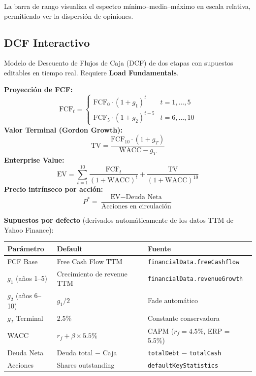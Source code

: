 \documentclass[11pt, a4paper]{article}
\newcommand{\code}[1]{\texttt{#1}}
\begin{document}
La barra de rango visualiza el espectro mínimo--media--máximo en escala relativa, permitiendo ver la dispersión de opiniones.

\subsection{DCF Interactivo}

Modelo de Descuento de Flujos de Caja (DCF) de dos etapas con supuestos editables en tiempo real. Requiere \textbf{Load Fundamentals}.

\begin{formulabox}
\textbf{Proyección de FCF:}
\[
  \text{FCF}_t =
  \begin{cases}
    \text{FCF}_0 \cdot (1 + g_1)^t & t = 1, \ldots, 5 \\
    \text{FCF}_5 \cdot (1 + g_2)^{t-5} & t = 6, \ldots, 10
  \end{cases}
\]
\textbf{Valor Terminal (Gordon Growth):}
\[
  \text{TV} = \frac{\text{FCF}_{10} \cdot (1 + g_T)}{\text{WACC} - g_T}
\]
\textbf{Enterprise Value:}
\[
  \text{EV} = \sum_{t=1}^{10} \frac{\text{FCF}_t}{(1+\text{WACC})^t} + \frac{\text{TV}}{(1+\text{WACC})^{10}}
\]
\textbf{Precio intrínseco por acción:}
\[
  P^* = \frac{\text{EV} - \text{Deuda Neta}}{\text{Acciones en circulación}}
\]
\end{formulabox}

\textbf{Supuestos por defecto} (derivados automáticamente de los datos TTM de Yahoo Finance):

\begin{center}
\begin{tabular}{lll}
  \toprule
  \textbf{Parámetro} & \textbf{Default} & \textbf{Fuente} \\
  \midrule
  FCF Base          & Free Cash Flow TTM           & \code{financialData.freeCashflow} \\
  $g_1$ (años 1--5) & Crecimiento de revenue TTM   & \code{financialData.revenueGrowth} \\
  $g_2$ (años 6--10) & $g_1 / 2$                  & Fade automático \\
  $g_T$ Terminal    & 2.5\%                        & Constante conservadora \\
  WACC              & $r_f + \beta \times 5.5\%$   & CAPM ($r_f = 4.5\%$, ERP = 5.5\%) \\
  Deuda Neta        & Deuda total $-$ Caja         & \code{totalDebt} $-$ \code{totalCash} \\
  Acciones          & Shares outstanding           & \code{defaultKeyStatistics} \\
  \bottomrule
\end{tabular}
\end{center}
\end{document}
